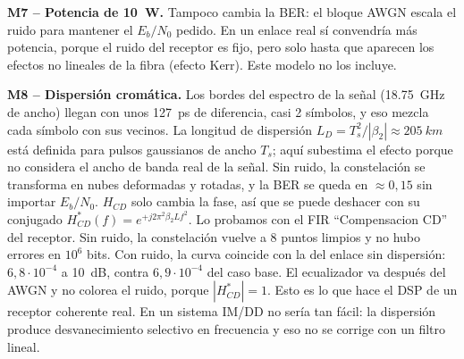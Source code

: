 \documentclass[10pt,a4paper]{article}
\begin{document}
\textbf{M7 -- Potencia de \SI{10}{W}.} Tampoco cambia la BER: el bloque AWGN escala el ruido para mantener el $E_b/N_0$ pedido. En un enlace real sí convendría más potencia, porque el ruido del receptor es fijo, pero solo hasta que aparecen los efectos no lineales de la fibra (efecto Kerr). Este modelo no los incluye.

\textbf{M8 -- Dispersión cromática.} Los bordes del espectro de la señal (\SI{18.75}{GHz} de ancho) llegan con unos \SI{127}{ps} de diferencia, casi 2 símbolos, y eso mezcla cada símbolo con sus vecinos. La longitud de dispersión $L_D=T_s^2/|\beta_2|\approx\SI{205}{km}$ está definida para pulsos gaussianos de ancho $T_s$; aquí subestima el efecto porque no considera el ancho de banda real de la señal. Sin ruido, la constelación se transforma en nubes deformadas y rotadas, y la BER se queda en $\approx0{,}15$ sin importar $E_b/N_0$. $H_{CD}$ solo cambia la fase, así que se puede deshacer con su conjugado $H^*_{CD}(f)=e^{+j2\pi^2\beta_2Lf^2}$. Lo probamos con el FIR ``Compensacion CD'' del receptor. Sin ruido, la constelación vuelve a 8 puntos limpios y no hubo errores en $10^6$ bits. Con ruido, la curva coincide con la del enlace sin dispersión: $6{,}8\cdot10^{-4}$ a \SI{10}{dB}, contra $6{,}9\cdot10^{-4}$ del caso base. El ecualizador va después del AWGN y no colorea el ruido, porque $|H^*_{CD}|=1$. Esto es lo que hace el DSP de un receptor coherente real. En un sistema IM/DD no sería tan fácil: la dispersión produce desvanecimiento selectivo en frecuencia y eso no se corrige con un filtro lineal.
\end{document}
